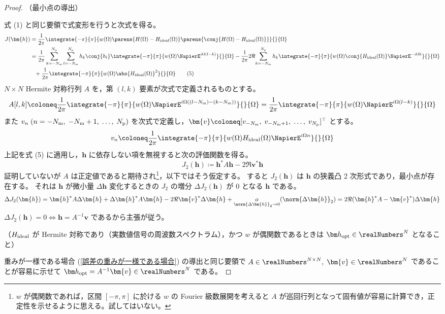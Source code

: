             \begin{proof}
                \quad\par\noindent
                （最小点の導出）
                \par
                式 (1) と同じ要領で式変形を行うと次式を得る。
                \begin{align*}
                    J(\bm{h}) &= \frac{1}{2\pi}\integrate{-\pi}{\pi}{w(\Omega)\parens{H(\Omega)-\Hideal(\Omega)}\parens{\conj{H(\Omega)-\Hideal(\Omega)}}}{}{\Omega} \\
                    &= \frac{1}{2\pi}\sum_{k=-\Nm}^\Np\sum_{l=-\Nm}^\Np h_k\conj{h_l}\integrate{-\pi}{\pi}{w(\Omega)\NapierE^{i\Omega(l-k)}}{}{\Omega} - \frac{1}{2\pi}2\Re{\sum_{k=-\Nm}^\Np h_k\integrate{-\pi}{\pi}{w(\Omega)\conj{\Hideal(\Omega)}\NapierE^{-i\Omega k}}{}{\Omega}} \\
                    &\phantom{=} + \frac{1}{2\pi}\integrate{-\pi}{\pi}{w(\Omega)\abs{\Hideal(\Omega)}^2}{}{\Omega}\tag{5}
                \end{align*}
                $N\times N$ Hermite 対称行列 $A$ を，第 $(l,k)$ 要素が次式で定義されるものとする。
                \[ A[l,k] \coloneq \frac{1}{2\pi}\integrate{-\pi}{\pi}{w(\Omega)\NapierE^{i\Omega((l-\Nm)-(k-\Nm))}}{}{\Omega} = \frac{1}{2\pi}\integrate{-\pi}{\pi}{w(\Omega)\NapierE^{i\Omega(l-k)}}{}{\Omega} \]
                また $v_n\;(n=-{N_\text{m}},\;-{N_\text{m}}+1,\;\dots,\;{N_\text{p}})$ を次式で定義し，$\bm{v}\coloneq[v_{-\Nm},\;v_{-\Nm+1},\;\dots,\;v_\Np]^\top$ とする。
                \[ v_n \coloneq \frac{1}{2\pi}\integrate{-\pi}{\pi}{w(\Omega)\Hideal(\Omega)\NapierE^{i\Omega n}}{}{\Omega} \]
                上記を式 (5) に適用し，$\bm{h}$ に依存しない項を無視すると次の評価関数を得る。
                \[ J_2(\bm{h}) \coloneq \bm{h}^*A\bm{h} - 2\Re{\bm{v}^*\bm{h}} \]
                証明していないが $A$ は正定値であると期待され\footnote{$w$ が偶関数であれば，区間 $[-\pi,\pi]$ に於ける $w$ の Fourier 級数展開を考えると $A$ が巡回行列となって固有値が容易に計算でき，正定性を示せるように思える。試してはいない。}，以下ではそう仮定する。
                すると $J_2(\bm{h})$ は $\bm{h}$ の狭義凸 2 次形式であり，最小点が存在する。
                それは $\bm{h}$ が微小量 $\Delta\bm{h}$ 変化するときの $J_2$ の増分 $\Delta J_2(\bm{h})$ が 0 となる $\bm{h}$ である。
                \[ \Delta J_2(\bm{h}) = \bm{h}^*A\Delta\bm{h} + \Delta\bm{h}^*A\bm{h} - 2\Re{\bm{v}^*\Delta\bm{h}} + \underset{\norm{\Delta\bm{h}}_2\to 0}{o}(\norm{\Delta\bm{h}}_2) = 2\Re{(\bm{h}^*A-\bm{v}^*)\Delta\bm{h}} \]
                $\Delta J_2(\bm{h}) = 0\iff\bm{h} = A^{-1}\bm{v}$ であるから主張が従う。
                \newline
                \par\noindent
                （$H_\text{ideal}$ が Hermite 対称であり（実数値信号の周波数スペクトラム），かつ $w$ が偶関数であるときは $\vhOpt\in\realNumbers^N$ となること）
                \par
                重みが一様である場合 (\cref{誤差の重みが一様である場合}) の導出と同じ要領で $A\in\realNumbers^{N\times N},\;\bm{v}\in\realNumbers^N$ であることが容易に示せて $\vhOpt=A^{-1}\bm{v}\in\realNumbers^N$ である。
            \end{proof}
